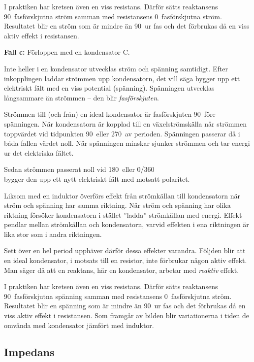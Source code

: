 I praktiken har kretsen även en viss resistans.
Därför sätts reaktansens 90\degree~fasförskjutna ström samman med resistansens
0\degree~fasförskjutna ström.
Resultatet blir en ström som är mindre än 90\degree~ur fas och det förbrukas
då en viss aktiv effekt i resistansen.

\textbf{Fall c:} Förloppen med en kondensator C.

Inte heller i en kondensator utvecklas ström och spänning samtidigt.
Efter inkopplingen laddar strömmen upp kondensatorn, det vill säga bygger upp
ett elektriskt fält med en viss potential (spänning).
Spänningen utvecklas långsammare än strömmen -- den blir \emph{fasförskjuten}.

Strömmen till (och från) en ideal kondensator är fasförskjuten 90\degree~före
spänningen.
När kondensatorn är kopplad till en växelströmskälla når strömmen toppvärdet
vid tidpunkten 90\degree~eller 270\degree~av perioden.
Spänningen passerar då i båda fallen värdet noll.
När spänningen minskar sjunker strömmen och tar energi ur det elektriska
fältet.

Sedan strömmen passerat noll vid 180\degree~eller 0\degree/360\degree\\ bygger
den upp ett nytt elektriskt fält med motsatt polaritet.

Liksom med en induktor överförs effekt från strömkällan till kondensatorn när
ström och spänning har samma riktning.
När ström och spänning har olika riktning försöker kondensatorn i stället
''ladda'' strömkällan med energi.
Effekt pendlar mellan strömkällan och kondensatorn, varvid effekten i
ena riktningen är lika stor som i andra riktningen.

Sett över en hel period upphäver därför dessa effekter varandra.
Följden blir att en ideal kondensator, i motsats till en resistor, inte
förbrukar någon aktiv effekt.
Man säger då att en reaktans, här en kondensator, arbetar med \emph{reaktiv}
effekt.

I praktiken har kretsen även en viss resistans.
Därför sätts reaktansens 90\degree~fasförskjutna spänning samman med
resistansens 0\degree~fasförskjutna ström.
Resultatet blir en spänning som är mindre än 90\degree~ur fas och det
förbrukas då en viss aktiv effekt i resistansen.
Som framgår av bilden blir variationerna i tiden de omvända med kondensator
jämfört med induktor.

\subsection{Impedans}

